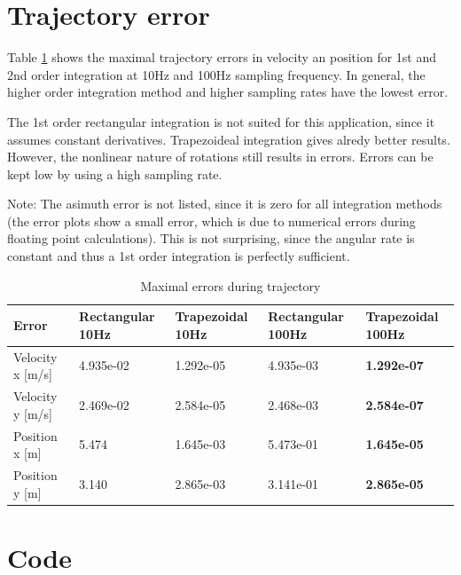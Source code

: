 \documentclass{article}
\begin{document}
\section*{Trajectory error}

Table \ref{tab:err} shows the maximal trajectory errors in velocity an position for 1st and 2nd order integration at 10Hz and 100Hz sampling frequency.
In general, the higher order integration method and higher sampling rates have the lowest error.

The 1st order rectangular integration is not suited for this application, since it assumes constant derivatives.
Trapezoideal integration gives alredy better results.
However, the nonlinear nature of rotations still results in errors.
Errors can be kept low by using a high sampling rate.

Note: The asimuth error is not listed, since it is zero for all integration methods (the error plots show a small error, which is due to numerical errors during floating point calculations).
This is not surprising, since the angular rate is constant and thus a 1st order integration is perfectly sufficient.

\begin{table}[h]
\centering
\begin{tabular}{lllll}
Error & Rectangular 10Hz & Trapezoidal 10Hz & Rectangular 100Hz & Trapezoidal 100Hz \\
\hline
Velocity x [m/s] & 4.935e-02 & 1.292e-05 & 4.935e-03 & \textbf{1.292e-07} \\
Velocity y [m/s] & 2.469e-02 & 2.584e-05 & 2.468e-03 & \textbf{2.584e-07} \\
Position x [m] & 5.474 & 1.645e-03 & 5.473e-01 & \textbf{1.645e-05} \\
Position y [m] & 3.140 & 2.865e-03 & 3.141e-01 & \textbf{2.865e-05}
\end{tabular}
\caption{Maximal errors during trajectory}
\label{tab:err}
\end{table}

\section*{Code}

\end{document}
